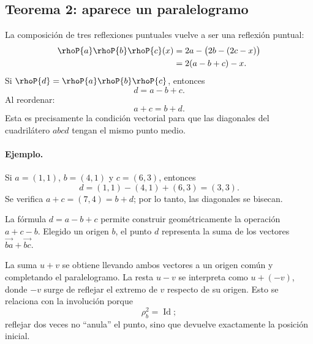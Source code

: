 \subsection{Teorema 2: aparece un paralelogramo}

La composición de tres reflexiones puntuales vuelve a ser una reflexión puntual:
\[
\begin{aligned}
\rhoP{a}\rhoP{b}\rhoP{c}(x)
  &=2a-\bigl(2b-(2c-x)\bigr)\\
  &=2(a-b+c)-x.
\end{aligned}
\]
Si \(\rhoP{d}=\rhoP{a}\rhoP{b}\rhoP{c}\), entonces
\[
  \boxed{d=a-b+c}.
\]
Al reordenar:
\[
  a+c=b+d.
\]
Esta es precisamente la condición vectorial para que las diagonales del cuadrilátero
\(a b c d\) tengan el mismo punto medio.

\begin{center}
\end{center}

\paragraph{Ejemplo.}
Si \(a=(1,1)\), \(b=(4,1)\) y \(c=(6,3)\), entonces
\[
  d=(1,1)-(4,1)+(6,3)=(3,3).
\]
Se verifica \(a+c=(7,4)=b+d\); por lo tanto, las diagonales se bisecan.

\begin{idea}
La fórmula \(d=a-b+c\) permite construir geométricamente la operación
\(a+c-b\). Elegido un origen \(b\), el punto \(d\) representa la suma de los
vectores \(\overrightarrow{ba}+\overrightarrow{bc}\).

La suma \(u+v\) se obtiene llevando ambos vectores a un origen común y completando el
paralelogramo. La resta \(u-v\) se interpreta como \(u+(-v)\), donde \(-v\) surge de reflejar
el extremo de \(v\) respecto de su origen. Esto se relaciona con la involución porque
\[
  \rho_b^2=\operatorname{Id};
\]
reflejar dos veces no ``anula'' el punto, sino que devuelve exactamente la posición inicial.
\end{idea}

